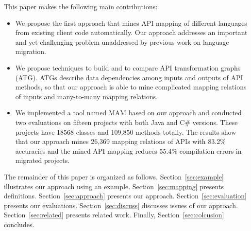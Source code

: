 This paper makes the following main contributions:

\begin{itemize}\vspace*{-1.5ex}
\item We propose the first approach that mines API mapping of
different languages from existing client code automatically. Our
approach addresses an important and yet challenging problem
unaddressed by previous work on language migration.\vspace*{-1.5ex}
\item We propose techniques to build and to compare API
transformation graphs (ATG). ATGs describe data dependencies among
inputs and outputs of API methods, so that our approach is able to
mine complicated mapping relations of inputs and many-to-many
mapping relations.\vspace*{-1.5ex}
\item We
implemented a tool named MAM based on our approach and conducted two
evaluations on fifteen projects with both Java and C\# versions.
These projects have 18568 classes and 109,850 methods totally. The
results show that our approach mines 26,369 mapping relations of
APIs with 83.2\% accuracies and the mined API mapping reduces 55.4\%
compilation errors in migrated projects.
\end{itemize}\vspace*{-1.5ex}

The remainder of this paper is organized as follows. Section~\ref{sec:example}
illustrates our approach using an example. Section~\ref{sec:mapping}
presents definitions. Section~\ref{sec:approach} presents our
approach. Section~\ref{sec:evaluation} presents our evaluations.
Section~\ref{sec:discuss} discusses issues of our approach.
Section~\ref{sec:related} presents related work. Finally,
Section~\ref{sec:colcusion} concludes.
